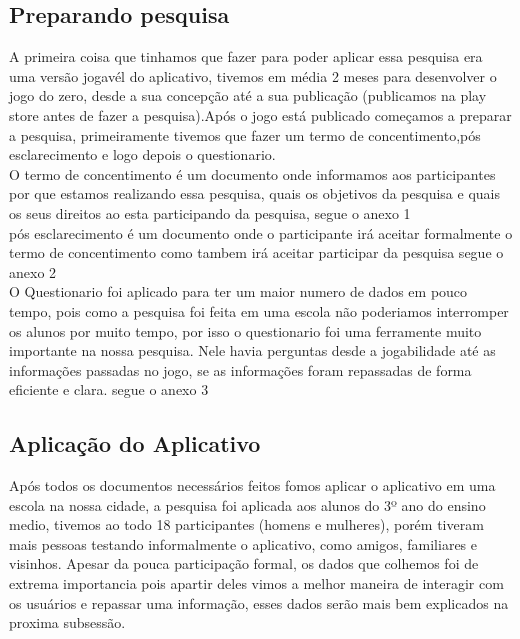\documentclass[12pt]{article}
\begin{document}
	\subsection{Preparando pesquisa} %
		A primeira coisa que tinhamos que fazer para poder aplicar essa pesquisa era uma versão jogavél do aplicativo, tivemos em média 2 meses para desenvolver o jogo do zero, desde a sua concepção até a sua publicação (publicamos na play store antes de fazer a pesquisa).Após o jogo está publicado começamos a preparar a pesquisa, primeiramente tivemos que fazer um termo de concentimento,pós esclarecimento e logo depois o questionario.\\
		
		O termo de concentimento é um documento onde informamos aos participantes por que estamos realizando essa pesquisa, quais os objetivos da pesquisa e quais os seus direitos ao esta participando da pesquisa, segue o anexo 1 \\
		
		pós esclarecimento é um documento onde o participante irá aceitar formalmente o termo de concentimento como tambem irá aceitar participar da pesquisa segue o anexo 2 \\
		
		O Questionario foi aplicado para ter um maior numero de dados em pouco tempo, pois como a pesquisa foi feita em uma escola não poderiamos interromper os alunos por muito tempo, por isso o questionario foi uma ferramente muito importante na nossa pesquisa. Nele havia perguntas desde a jogabilidade até as informações passadas no jogo, se as informações foram repassadas de forma eficiente e clara. segue o anexo 3\\
		
	
	\subsection{Aplicação do Aplicativo}%
		Após todos os documentos necessários feitos fomos aplicar o aplicativo em uma escola na nossa cidade, a pesquisa foi aplicada aos alunos do 3º ano do ensino medio, tivemos ao todo 18 participantes (homens e mulheres), porém tiveram mais pessoas testando informalmente o aplicativo, como amigos, familiares e visinhos. Apesar da pouca participação formal, os dados que colhemos foi de extrema importancia pois apartir deles vimos a melhor maneira de interagir com os usuários e repassar uma informação, esses dados serão mais bem explicados na proxima subsessão.\\
		
\end{document}
